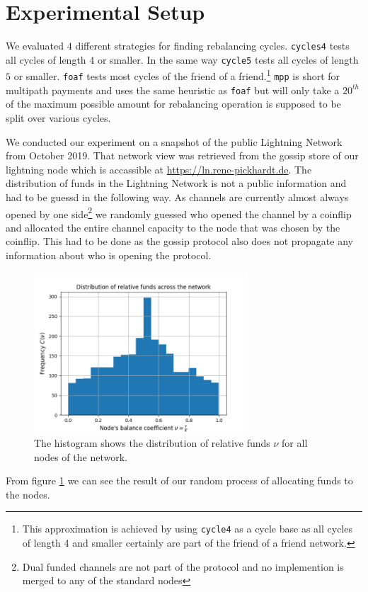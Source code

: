 \documentclass[a4paper]{paper}
\begin{document}
\section{Experimental Setup}
\label{sec:setup}

We evaluated $4$ different strategies for finding rebalancing cycles. \texttt{cycles4} tests all cycles of length $4$ or smaller. In the same way \texttt{cycle5} tests all cycles of length $5$ or smaller. \texttt{foaf} tests most cycles of the friend of a friend.\footnote{This approximation is achieved by using \texttt{cycle4} as a cycle base as all cycles of length 4 and smaller certainly are part of the friend of a friend network.}
\texttt{mpp} is short for multipath payments and uses the same heuristic as \texttt{foaf} but will only take a $20^{th}$ of the maximum possible amount for rebalancing operation is supposed to be split over various cycles.

We conducted our experiment on a snapshot of the public Lightning Network from October 2019.
That network view was retrieved from the gossip store of our lightning node which is accassible at \url{https://ln.rene-pickhardt.de}.
The distribution of funds in the Lightning Network is not a public information and had to be guessd in the following way.
As channels are currently almost always opened by one side\footnote{Dual funded channels are not part of the protocol and no implemention is merged to any of the standard nodes} we randomly guessed who opened the channel by a coinflip and allocated the entire channel capacity to the node that was chosen by the coinflip. 
This had to be done as the gossip protocol also does not propagate any information about who is opening the protocol.
\begin{figure}
 \centering
 \includegraphics[width=8cm]{code/vs/fig/distribution_of_nus.png}
 \caption{The histogram shows the distribution of relative funds $\nu$ for all nodes of the network.}
 \label{fig:initial_funds}
\end{figure}
From figure \cref{fig:initial_funds} we can see the result of our random process of allocating funds to the nodes.
\end{document}

